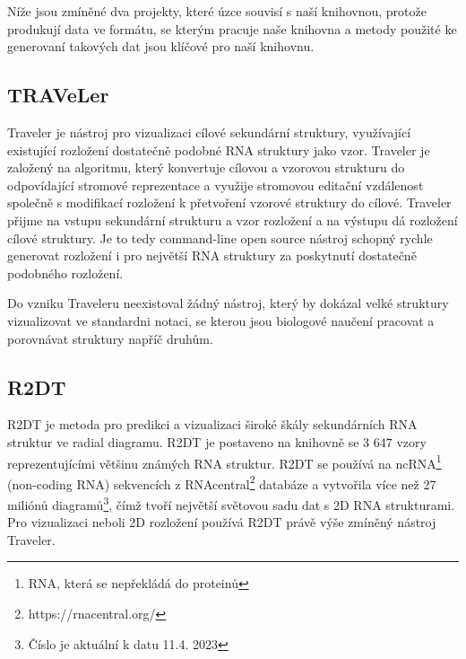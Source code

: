 Níže jsou zmíněné dva projekty, které úzce souvisí s naší knihovnou, protože
produkují data ve formátu, se kterým pracuje naše knihovna a metody
použité ke generovaní takových dat jsou klíčové pro naší knihovnu.

\subsection{TRAVeLer} 

Traveler\cite{Traveler2017} je nástroj pro vizualizaci cílové sekundární
struktury, využívající existující rozložení dostatečně podobné RNA struktury
jako vzor. Traveler je založený na algoritmu, který konvertuje cílovou a
vzorovou strukturu do odpovídající stromové reprezentace a využije stromovou
editační vzdálenost společně s modifikací rozložení k přetvoření vzorové
struktury do cílové. Traveler přijme na vstupu sekundární strukturu a vzor
rozložení a na výstupu dá rozložení cílové struktury. Je to tedy command-line
open source nástroj schopný rychle generovat rozložení i pro největší RNA
struktury za poskytnutí dostatečně podobného rozložení.

Do vzniku Traveleru neexistoval žádný nástroj, který by dokázal velké struktury
vizualizovat ve standardni notaci, se kterou jsou biologové naučení pracovat a
porovnávat struktury napříč druhům.

\subsection{R2DT} 

R2DT\cite{R2DT2021} je metoda pro predikci a vizualizaci široké škály
sekundárních RNA struktur ve radial diagramu. R2DT je postaveno na knihovně se
3 647 vzory reprezentujícími většinu známých RNA struktur. R2DT se používá na
ncRNA\footnote{RNA, která se nepřekládá do proteinů} (non-coding RNA)
sekvencích z RNAcentral\footnote{https://rnacentral.org/} databáze a vytvořila
více než 27 miliónů diagramů\footnote{Číslo je aktuální k datu 11.4. 2023},
čímž tvoří největší světovou sadu dat s 2D RNA strukturami. Pro vizualizaci
neboli 2D rozložení používá R2DT právě výše zmíněný nástroj Traveler.
